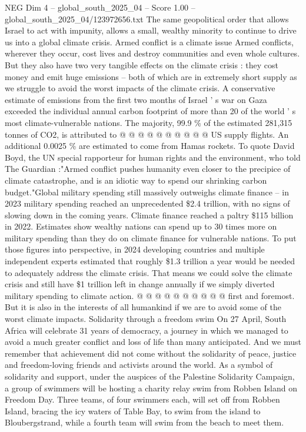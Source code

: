 \begin{textsample}{NEG Dim 4 – global\_south\_2025\_04 – Score 1.00 – global\_south\_2025\_04/123972656.txt}
The same geopolitical order that allows Israel to act with impunity, allows a small, wealthy minority to continue to drive us into a global climate crisis.
Armed conflict is a climate issue Armed conflicts, wherever they occur, cost lives and destroy communities and even whole cultures.
But they also have two very tangible effects on the climate crisis : they cost money and emit huge emissions -- both of which are in extremely short supply as we struggle to avoid the worst impacts of the climate crisis.
A conservative estimate of emissions from the first two months of Israel ' s war on Gaza exceeded the individual annual carbon footprint of more than 20 of the world ' s most climate-vulnerable nations.
The majority, 99.9 \% of the estimated 281,315 tonnes of CO2, is attributed to @ @ @ @ @ @ @ @ @ @ US supply flights.
An additional 0.0025 \% are estimated to come from Hamas rockets.
To quote David Boyd, the UN special rapporteur for human rights and the environment, who told The Guardian :"Armed conflict pushes humanity even closer to the precipice of climate catastrophe, and is an idiotic way to spend our shrinking carbon budget."Global military spending still massively outweighs climate finance -- in 2023 military spending reached an unprecedented \$2.4 trillion, with no signs of slowing down in the coming years.
Climate finance reached a paltry \$115 billion in 2022.
Estimates show wealthy nations can spend up to 30 times more on military spending than they do on climate finance for vulnerable nations.
To put those figures into perspective, in 2024 developing countries and multiple independent experts estimated that roughly \$1.3 trillion a year would be needed to adequately address the climate crisis.
That means we could solve the climate crisis and still have \$1 trillion left in change annually if we simply diverted military spending to climate action. @ @ @ @ @ @ @ @ @ @ first and foremost.
But it is also in the interests of all humankind if we are to avoid some of the worst climate impacts.
Solidarity through a freedom swim On 27 April, South Africa will celebrate 31 years of democracy, a journey in which we managed to avoid a much greater conflict and loss of life than many anticipated.
And we must remember that achievement did not come without the solidarity of peace, justice and freedom-loving friends and activists around the world.
As a symbol of solidarity and support, under the auspices of the Palestine Solidarity Campaign, a group of swimmers will be hosting a charity relay swim from Robben Island on Freedom Day.
Three teams, of four swimmers each, will set off from Robben Island, bracing the icy waters of Table Bay, to swim from the island to Bloubergstrand, while a fourth team will swim from the beach to meet them.

\end{textsample}
